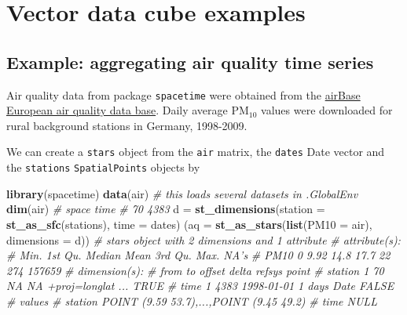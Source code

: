 \documentclass[]{book}
\newenvironment{Shaded}{\begin{snugshade}}{\end{snugshade}}
\newcommand{\CommentTok}[1]{\textcolor[rgb]{0.56,0.35,0.01}{\textit{#1}}}
\newcommand{\DataTypeTok}[1]{\textcolor[rgb]{0.13,0.29,0.53}{#1}}
\newcommand{\KeywordTok}[1]{\textcolor[rgb]{0.13,0.29,0.53}{\textbf{#1}}}
\newcommand{\NormalTok}[1]{#1}
\newcommand{\StringTok}[1]{\textcolor[rgb]{0.31,0.60,0.02}{#1}}
\begin{document}
\hypertarget{vector-data-cube-examples}{%
\section{Vector data cube examples}\label{vector-data-cube-examples}}

\hypertarget{example-aggregating-air-quality-time-series}{%
\subsection{Example: aggregating air quality time series}\label{example-aggregating-air-quality-time-series}}

Air quality data from package \texttt{spacetime} were
obtained from the \href{https://www.eea.europa.eu/data-and-maps/data/aqereporting-8}{airBase European air quality data
base}.
Daily average PM\(_{10}\) values were downloaded for rural background
stations in Germany, 1998-2009.

We can create a \texttt{stars} object from the \texttt{air} matrix, the \texttt{dates}
Date vector and the \texttt{stations} \texttt{SpatialPoints} objects by

\begin{Shaded}
\begin{Highlighting}[]
\KeywordTok{library}\NormalTok{(spacetime)}
\KeywordTok{data}\NormalTok{(air) }\CommentTok{# this loads several datasets in .GlobalEnv}
\KeywordTok{dim}\NormalTok{(air)}
\CommentTok{# space  time }
\CommentTok{#    70  4383}
\NormalTok{d =}\StringTok{ }\KeywordTok{st_dimensions}\NormalTok{(}\DataTypeTok{station =} \KeywordTok{st_as_sfc}\NormalTok{(stations), }\DataTypeTok{time =}\NormalTok{ dates)}
\NormalTok{(}\DataTypeTok{aq =} \KeywordTok{st_as_stars}\NormalTok{(}\KeywordTok{list}\NormalTok{(}\DataTypeTok{PM10 =}\NormalTok{ air), }\DataTypeTok{dimensions =}\NormalTok{ d))}
\CommentTok{# stars object with 2 dimensions and 1 attribute}
\CommentTok{# attribute(s):}
\CommentTok{#       Min. 1st Qu. Median Mean 3rd Qu. Max.   NA's}
\CommentTok{# PM10     0    9.92   14.8 17.7      22  274 157659}
\CommentTok{# dimension(s):}
\CommentTok{#         from   to     offset  delta            refsys point}
\CommentTok{# station    1   70         NA     NA +proj=longlat ...  TRUE}
\CommentTok{# time       1 4383 1998-01-01 1 days              Date FALSE}
\CommentTok{#                                          values}
\CommentTok{# station POINT (9.59 53.7),...,POINT (9.45 49.2)}
\CommentTok{# time                                       NULL}
\end{Highlighting}
\end{Shaded}
\end{document}
